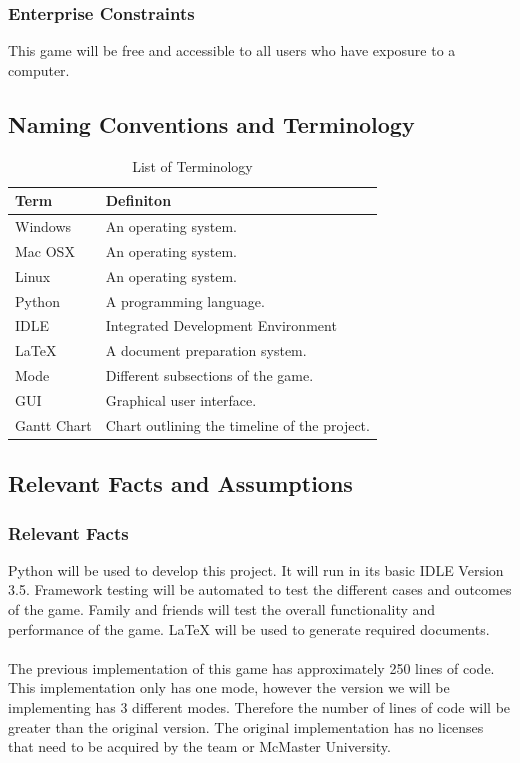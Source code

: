 \documentclass[12pt, titlepage]{article}
\begin{document}
\subsubsection{Enterprise Constraints}
This game will be free and accessible to all users who have exposure to a computer. 

\subsection{Naming Conventions and Terminology}

\begin{table}[H]
		\centering
		\caption{List of Terminology}
		\label{tab:table3}
		\begin{tabular}{ll}
			\hline
			Term & Definiton\\
			\hline
			Windows & An operating system.\\
			Mac OSX & An operating system.\\
			Linux & An operating system.\\
			Python & A programming language.\\
			IDLE & Integrated Development Environment\\
			LaTeX & A document preparation system. \\
			Mode & Different subsections of the game.\\
			GUI & Graphical user interface.\\
			Gantt Chart &Chart outlining the timeline of the project.\\
			\hline
		\end{tabular}
	\end{table}



\subsection{Relevant Facts and Assumptions}
\subsubsection{Relevant Facts}

Python will be used to develop this project. It will run in its basic IDLE Version 3.5. Framework testing will be automated to test the different cases and outcomes of the game. Family and friends will test the overall functionality and performance of the game. LaTeX will be used to generate required documents.\\
\\
The previous implementation of this game has approximately 250 lines of code. This implementation only has one mode, however the version we will be implementing has 3 different modes. Therefore the number of lines of code will be greater than the original version. The original implementation has no licenses that need to be acquired by the team or McMaster University.
\end{document}
